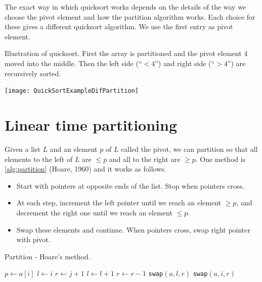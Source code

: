 The exact way in which quicksort works depends on the details of the way we choose the pivot element and how the 
partition algorithm works. Each choice for these gives a different quicksort algorithm.
We use the first entry as pivot element.

\begin{Boxample} \label{ex:quicksortSmall}
Illustration of quicksort. First the array is partitioned and the pivot element 4 moved into the middle. 
Then the left side (``$< 4$'') and right side (``$> 4$'') are recursively sorted.
\begin{center}
  \texttt{[image: QuickSortExampleDifPartition]}
\end{center}
\end{Boxample}


\section{Linear time partitioning}
Given a list $L$ and an element $p$ of $L$ called the pivot, we can partition so
 that all elements to the left of $L$ are $\leq p$ and all to the right are 
$\geq p$. One method is \cref{alg:partition} (Hoare, 1960) and it works as follows.
\begin{itemize}
\item Start with pointers at opposite ends of the list. Stop when pointers cross.
\item At each step, increment the left pointer until we reach an element $\geq p$, and decrement the right one until we reach an element $\leq p$. 
\item Swap these elements and continue. When pointers cross, swap right pointer with pivot.
\end{itemize}

\begin{algorithm}[H]
  \caption{Partition - Hoare's method.}
    \label{alg:partition}
\begin{algorithmic}[0]
	\State $p \gets a[i]$ 
	\State $l \gets i $ 
	\State $r \gets j+1$ 
		\Repeat
			\State $l \gets l+1$ 
		\Repeat
			\State $r \gets r-1$ 
			\State \texttt{swap}$(a,l,r)$  
		\Else
			\State \texttt{swap}$(a,i,r)$  
			\State {}
		\EndIf
	\EndWhile
\EndFunction  
\end{algorithmic}
\end{algorithm}


